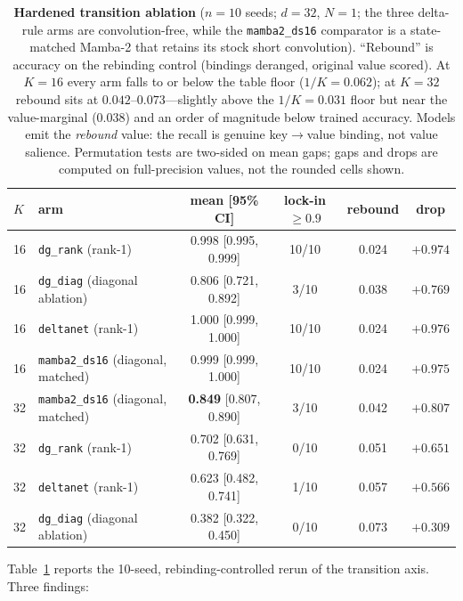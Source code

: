 \documentclass{article}
\newcommand{\dnet}{\texttt{deltanet}}
\newcommand{\dgrank}{\texttt{dg\_rank}}
\newcommand{\dgdiag}{\texttt{dg\_diag}}
\begin{document}
\begin{table}[t]
\centering
\caption{\textbf{Hardened transition ablation} ($n{=}10$ seeds; $d{=}32$, $N{=}1$; the three delta-rule arms are convolution-free, while the \texttt{mamba2\_ds16} comparator is a state-matched Mamba-2 that retains its stock short convolution). ``Rebound'' is accuracy on the rebinding control (bindings deranged, original value scored). At $K{=}16$ every arm falls to or below the table floor ($1/K{=}0.062$); at $K{=}32$ rebound sits at $0.042$--$0.073$---slightly above the $1/K{=}0.031$ floor but near the value-marginal ($0.038$) and an order of magnitude below trained accuracy. Models emit the \emph{rebound} value: the recall is genuine key$\to$value binding, not value salience. Permutation tests are two-sided on mean gaps; gaps and drops are computed on full-precision values, not the rounded cells shown.}
\label{tab:hardened}
\vskip 0.1in
\small
\begin{tabular}{llcccc}
\toprule
$K$ & arm & mean [95\% CI] & lock-in $\ge 0.9$ & rebound & drop \\
\midrule
16 & \dgrank{} (rank-1) & 0.998 [0.995, 0.999] & 10/10 & 0.024 & $+0.974$ \\
16 & \dgdiag{} (diagonal ablation) & 0.806 [0.721, 0.892] & 3/10 & 0.038 & $+0.769$ \\
16 & \dnet{} (rank-1) & 1.000 [0.999, 1.000] & 10/10 & 0.024 & $+0.976$ \\
16 & \texttt{mamba2\_ds16} (diagonal, matched) & 0.999 [0.999, 1.000] & 10/10 & 0.024 & $+0.975$ \\
\midrule
32 & \texttt{mamba2\_ds16} (diagonal, matched) & \textbf{0.849} [0.807, 0.890] & 3/10 & 0.042 & $+0.807$ \\
32 & \dgrank{} (rank-1) & 0.702 [0.631, 0.769] & 0/10 & 0.051 & $+0.651$ \\
32 & \dnet{} (rank-1) & 0.623 [0.482, 0.741] & 1/10 & 0.057 & $+0.566$ \\
32 & \dgdiag{} (diagonal ablation) & 0.382 [0.322, 0.450] & 0/10 & 0.073 & $+0.309$ \\
\bottomrule
\end{tabular}
\end{table}

Table~\ref{tab:hardened} reports the 10-seed, rebinding-controlled rerun of the transition axis. Three findings:
\end{document}
